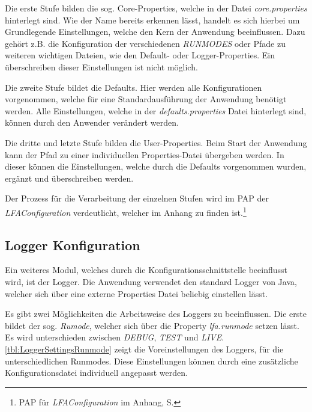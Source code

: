 Die erste Stufe bilden die sog. Core-Properties, welche in der Datei \textit{core.properties} hinterlegt sind. Wie der Name bereits erkennen lässt, handelt es sich hierbei um Grundlegende Einstellungen, welche den Kern der Anwendung beeinflussen. Dazu gehört z.B. die Konfiguration der verschiedenen \textit{RUNMODES} oder Pfade zu weiteren wichtigen Dateien, wie den Default- oder Logger-Properties. Ein überschreiben dieser Einstellungen ist nicht möglich.

Die zweite Stufe bildet die Defaults. Hier werden alle Konfigurationen vorgenommen, welche für eine Standardausführung der Anwendung benötigt werden. Alle Einstellungen, welche in der \textit{defaults.properties} Datei hinterlegt sind, können durch den Anwender verändert werden.

Die dritte und letzte Stufe bilden die User-Properties. Beim Start der Anwendung kann der Pfad zu einer individuellen Properties-Datei übergeben werden. In dieser können die Einstellungen, welche durch die Defaults vorgenommen wurden, ergänzt und  überschreiben werden.

Der Prozess für die Verarbeitung der einzelnen Stufen wird im \ac{PAP} der \textit{LFAConfiguration} verdeutlicht, welcher im Anhang zu finden ist.\footnote{\ac{PAP} für \textit{LFAConfiguration} im Anhang, S. \pageref{subsec:PAPLFAConfiguration}}


\subsection{Logger Konfiguration}
Ein weiteres Modul, welches durch die Konfigurationsschnittstelle beeinflusst wird, ist der Logger. Die Anwendung verwendet den standard Logger von Java, welcher sich über eine externe Properties Datei beliebig einstellen lässt.

Es gibt zwei Möglichkeiten die Arbeitsweise des Loggers zu beeinflussen. Die erste bildet der sog. \textit{Rumode}, welcher sich über die Property \textit{lfa.runmode} setzen lässt. Es wird unterschieden zwischen \textit{DEBUG}, \textit{TEST} und \textit{LIVE}. \autoref{tbl:LoggerSettingsRunmode} zeigt die Voreinstellungen des Loggers, für die unterschiedlichen Runmodes. Diese Einstellungen können durch eine zusätzliche Konfigurationsdatei individuell angepasst werden. 

